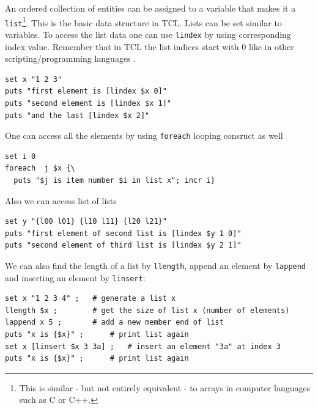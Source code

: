 \documentclass[
paper=a4,                       %
fontsize=11pt,                  %
twoside,                        %
footsepline,                    %
headsepline,                    %
headinclude=false,              %
footinclude=false,              %
pagesize,                       %
]{scrartcl}
\begin{document}
 An ordered collection of entities can be assigned to a variable that 
 makes it a \lstinline|list|\footnote{This is similar - but not entirely equivalent - to
 arrays in computer languages such as C or C++.}. This is the basic data
 structure in TCL. Lists can be set similar to variables.
 To access the list data one can use \lstinline|lindex| by using corresponding 
 index value. Remember that in TCL the list indices start with 0 like in other scripting/programming languages .
 
 {\small\vspace{0,2cm}
\begin{lstlisting}[numbers=none]
set x "1 2 3"
puts "first element is [lindex $x 0]"
puts "second element is [lindex $x 1]"
puts "and the last [lindex $x 2]"
\end{lstlisting}\vspace{0,2cm}
}

\noindent One can access all the elements by using \lstinline|foreach| looping 
consruct as well

{\small\vspace{0,2cm}
\begin{lstlisting}[numbers=none]
set i 0
foreach  j $x {\
  puts "$j is item number $i in list x"; incr i}
\end{lstlisting}\vspace{0,2cm}
}

\noindent Also we can access list of lists

{\small\vspace{0,2cm}
\begin{lstlisting}[numbers=none]
set y "{l00 l01} {l10 l11} {l20 l21}"
puts "first element of second list is [lindex $y 1 0]"
puts "second element of third list is [lindex $y 2 1]"
\end{lstlisting}\vspace{0,2cm}
}

\noindent We can also find the length of a list by \lstinline|llength|, append an 
element by \lstinline|lappend| and inserting an element by \lstinline|linsert|:
       
{\small\vspace{0,2cm}
\begin{lstlisting}[numbers=none]
set x "1 2 3 4" ; 	# generate a list x
llength $x ;		# get the size of list x (number of elements)
lappend x 5 ;		# add a new member end of list
puts "x is {$x}" ;		# print list again
set x [linsert $x 3 3a] ;	# insert an element "3a" at index 3
puts "x is {$x}" ;		# print list again
\end{lstlisting}
}\vspace{0,2cm}
\end{document}
